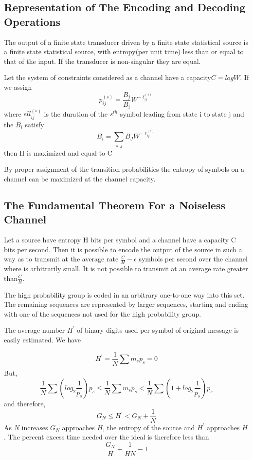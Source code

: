\documentclass[conference]{IEEEtran}
\begin{document}
\subsection{Representation of The Encoding and Decoding Operations}
\begin{theorem}
The output of a finite state transducer driven by a finite state statistical source is a finite state statistical source, with entropy(per unit time) less than or equal to that of the input. If the transducer is non-singular they are equal.
\end{theorem}
\begin{theorem}
Let the system of constraints considered as a channel have a capacity$C= logW$. If we assign
\[ p_{ij}^{(s)}=\dfrac{B_{j}}{B_{i}}W^{-\ell_{ij}^{(s)}} \]
where $ell_{ij}^{(s)}$ is the duration of the $s^{th}$ symbol leading from state i to state j and the $B_{i}$ satisfy
\[B_{i}=\sum_{s,j} B_{J}W^{-\ell_{ij}^{(s)}}\]
then H is maximized and equal to C
\end{theorem}
By proper assignment of the transition probabilities the entropy of symbols on a channel can be maximized at the channel capacity.


\subsection{The Fundamental Theorem For a Noiseless Channel}
\begin{theorem}
Let a source have entropy H bits per symbol and a channel have a capacity C bits per second. Then it is possible to encode the output of the source in such a way as to transmit at the average rate $\frac{C}{H}-\epsilon$
symbols per second over the channel where is arbitrarily small. It is not possible to transmit at an average rate greater than$\frac{C}{H}$.
\end{theorem}

The high probability group is coded in an arbitrary one-to-one way into this set. The remaining sequences are represented by larger sequences, starting and ending with one of the sequences not used for the high probability group.

The average number $H^{'}$ of binary digits used per symbol of original message is easily estimated. We have

\[
H^{'}=\dfrac{1}{N}\sum_{} m_{s}p_{s} = 0
\]
But,
\[
\dfrac{1}{N}\sum_{}(log_{2}\dfrac{1}{p_{s}})p_{s} \le \dfrac{1}{N}\sum_{} m_{s}p_{s} < \dfrac{1}{N}\sum_{} (1+log_{2}\dfrac{1}{p_{s}})p_{s}
\]
and therefore,
\[ G_{N}\le H^{'}<G_{N}+\dfrac{1}{N} \]
As $N$ increases $G_{N}$ approaches $H$, the entropy of the source and $H^{'}$ approaches $H$.
The percent excess time needed over the ideal is therefore less than
\[ \dfrac{G_{N}}{H}+\dfrac{1}{HN}-1\]
\end{document}
